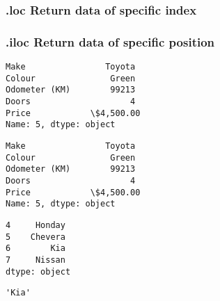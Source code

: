 \documentclass[11pt]{article}
\begin{document}
\hypertarget{loc-return-data-of-specific-index}{%
\subsubsection{\texorpdfstring{\textbf{.loc Return data of specific
index}}{.loc Return data of specific index}}\label{loc-return-data-of-specific-index}}

\hypertarget{iloc-return-data-of-specific-position}{%
\subsubsection{\texorpdfstring{\textbf{.iloc Return data of specific
position}}{.iloc Return data of specific position}}\label{iloc-return-data-of-specific-position}}

            \begin{tcolorbox}[breakable, size=fbox, boxrule=.5pt, pad at break*=1mm, opacityfill=0]
\begin{Verbatim}[commandchars=\\\{\}]
Make                Toyota
Colour               Green
Odometer (KM)        99213
Doors                    4
Price            \$4,500.00
Name: 5, dtype: object
\end{Verbatim}
\end{tcolorbox}
        
            \begin{tcolorbox}[breakable, size=fbox, boxrule=.5pt, pad at break*=1mm, opacityfill=0]
\begin{Verbatim}[commandchars=\\\{\}]
Make                Toyota
Colour               Green
Odometer (KM)        99213
Doors                    4
Price            \$4,500.00
Name: 5, dtype: object
\end{Verbatim}
\end{tcolorbox}
        
            \begin{tcolorbox}[breakable, size=fbox, boxrule=.5pt, pad at break*=1mm, opacityfill=0]
\begin{Verbatim}[commandchars=\\\{\}]
4     Honday
5    Chevera
6        Kia
7     Nissan
dtype: object
\end{Verbatim}
\end{tcolorbox}
        
            \begin{tcolorbox}[breakable, size=fbox, boxrule=.5pt, pad at break*=1mm, opacityfill=0]
\begin{Verbatim}[commandchars=\\\{\}]
'Kia'
\end{Verbatim}
\end{tcolorbox}
        
\end{document}
